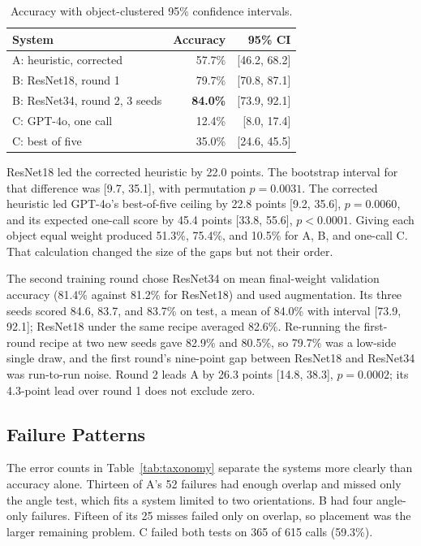 \documentclass[10pt,conference,compsoc]{IEEEtran}
\begin{document}
\begin{table}[t]
\caption{Accuracy with object-clustered 95\% confidence intervals.}
\label{tab:accuracy}
\centering
\begin{tabular}{lrr}
\toprule
System & Accuracy & 95\% CI \\
\midrule
A: heuristic, corrected & 57.7\% & [46.2, 68.2] \\
B: ResNet18, round 1 & 79.7\% & [70.8, 87.1] \\
B: ResNet34, round 2, 3 seeds & \textbf{84.0\%} & [73.9, 92.1] \\
C: GPT-4o, one call & 12.4\% & [8.0, 17.4] \\
C: best of five & 35.0\% & [24.6, 45.5] \\
\bottomrule
\end{tabular}
\end{table}

ResNet18 led the corrected heuristic by 22.0 points. The bootstrap interval
for that difference was [9.7, 35.1], with permutation $p=0.0031$. The
corrected heuristic led GPT-4o's best-of-five ceiling by 22.8 points [9.2,
35.6], $p=0.0060$, and its expected one-call score by 45.4 points [33.8,
55.6], $p<0.0001$. Giving each object equal weight produced 51.3\%, 75.4\%,
and 10.5\% for A, B, and one-call C. That calculation changed the size of the
gaps but not their order.

The second training round chose ResNet34 on mean final-weight validation
accuracy (81.4\% against 81.2\% for ResNet18) and used augmentation. Its
three seeds scored 84.6, 83.7, and 83.7\% on test, a mean of 84.0\% with
interval [73.9, 92.1]; ResNet18 under the same recipe averaged 82.6\%.
Re-running the first-round recipe at two new seeds gave 82.9\% and 80.5\%,
so 79.7\% was a low-side single draw, and the first round's nine-point gap
between ResNet18 and ResNet34 was run-to-run noise. Round 2 leads A by 26.3
points [14.8, 38.3], $p=0.0002$; its 4.3-point lead over round 1 does not
exclude zero.

\subsection{Failure Patterns}

The error counts in Table~\ref{tab:taxonomy} separate the systems more clearly
than accuracy alone. Thirteen of A's 52 failures had enough overlap and missed
only the angle test, which fits a system limited to two orientations. B had
four angle-only failures. Fifteen of its 25 misses failed only on overlap, so
placement was the larger remaining problem. C failed both tests on 365 of 615
calls (59.3\%).
\end{document}
